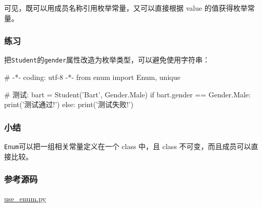 可见，既可以用成员名称引用枚举常量，又可以直接根据 value
的值获得枚举常量。

\hypertarget{ux7ec3ux4e60}{%
\subsubsection{练习}\label{ux7ec3ux4e60}}

把\texttt{Student}的\texttt{gender}属性改造为枚举类型，可以避免使用字符串：

\begin{pythoncode}
# -*- coding: utf-8 -*-
from enum import Enum, unique
\end{pythoncode}

\begin{pythoncode}
# 测试:
bart = Student('Bart', Gender.Male)
if bart.gender == Gender.Male:
    print('测试通过!')
else:
    print('测试失败!')
\end{pythoncode}

\hypertarget{ux5c0fux7ed3}{%
\subsubsection{小结}\label{ux5c0fux7ed3}}

\texttt{Enum}可以把一组相关常量定义在一个 class 中，且 class
不可变，而且成员可以直接比较。

\hypertarget{ux53c2ux8003ux6e90ux7801}{%
\subsubsection{参考源码}\label{ux53c2ux8003ux6e90ux7801}}

\href{https://github.com/michaelliao/learn-python3/blob/master/samples/oop_advance/use_enum.py}{use\_enum.py}

